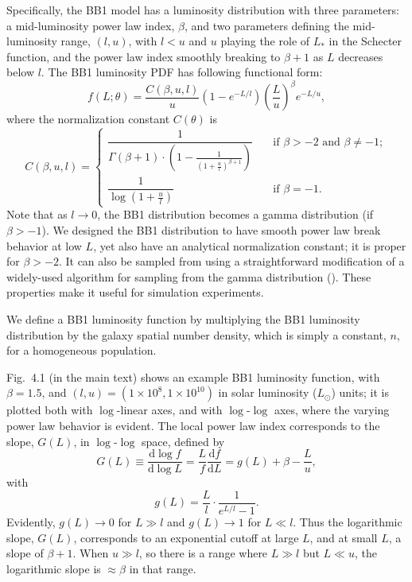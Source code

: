 \documentclass[12pt]{article}
\numberwithin{equation}{section}
\numberwithin{figure}{section}
\numberwithin{table}{section}
\newcommand{\dd}{\textrm{d}}
\newcommand{\lpdf}{f}
\begin{document}
Specifically, the BB1 model has a luminosity distribution with three parameters: a mid-luminosity power law index, $\beta$, and two parameters defining the mid-luminosity range, $(l, u)$, with $l < u$ and  $u$ playing the role of $L_*$ in the Schecter function, and the power law index smoothly breaking to $\beta+1$ as $L$ decreases below $l$.
The BB1 luminosity PDF has following functional form:
\begin{equation}
\label{eq:lumPDF} 
\lpdf(L ; \theta) = 
  \frac{C(\beta,u,l)}{u}\left(1-e^{-L/l}\right) \left(\frac{L}{u}\right)^{\beta} e^{-L/u},
\end{equation}
where the normalization constant $C(\theta)$ is
\begin{equation}
\label{eq:normLumPDF} 
C(\beta,u,l) =
  \begin{cases} \dfrac{1}{\Gamma(\beta+1)\cdot\left(1-\frac{1}{\left(1+\frac{u}{l}\right)^{\beta+1}}\right)} 
    & \quad \text{if } \beta > -2\text{ and }\beta \ne -1; \\
 \dfrac{1}{\log\left(1+\frac{u}{l}\right)} & \quad \text{if } \beta=-1.
  \end{cases}
\end{equation} 
Note that as $l\rightarrow 0$, the BB1 distribution becomes a gamma distribution (if $\beta > -1$).
We designed the BB1 distribution to have smooth power law break behavior at low $L$, yet also have an analytical normalization constant;
it is proper for $\beta > -2$.
It can also be sampled from using a straightforward modification of a widely-used algorithm for sampling from the gamma distribution (\citealt{ahrens_computer_1974}).
These properties make it useful for simulation experiments.

We define a BB1 luminosity function by multiplying the BB1 luminosity distribution by the galaxy spatial number density, which is simply a constant, $n$, for a homogeneous population.


Fig.~4.1 (in the main text) shows an example BB1 luminosity function, with $\beta = 1.5$, and $(l,u) = (1\times 10^{8}, 1\times 10^{10})$ in solar luminosity ($L_\odot$) units; it is plotted both with $\log$-linear axes, and with $\log$-$\log$ axes, where the varying power law behavior is evident.
The local power law index corresponds to the slope, $G(L)$, in $\log$-$\log$ space, defined by
\begin{equation}
	G(L) \equiv \frac{\dd\log{\lpdf}}{\dd\log{L}} = \frac{L}{\lpdf} \frac{\dd \lpdf}{\dd L} = g(L) + \beta - \frac{L}{u},
\end{equation}
with
\begin{equation}
	g(L) = \frac{L}{l}\cdot\frac{1}{e^{L/l} - 1}.
\end{equation}
Evidently, $g(L) \rightarrow 0$ for $L \gg l$ and $g(L) \rightarrow 1$ for $L \ll l$.
Thus the logarithmic slope, $G(L)$, corresponds to an exponential cutoff at large $L$, and at small $L$, a slope of $\beta + 1$.
When $u\gg l$, so there is a range where $L\gg l$ but $L\ll u$, the logarithmic slope is $\approx \beta$ in that range.
\end{document}
